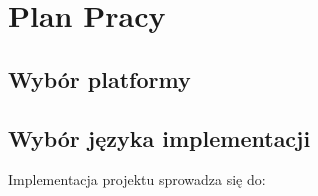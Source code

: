 \section{Plan Pracy}
\subsection{Wybór platformy}
\subsection{Wybór języka implementacji}
Implementacja projektu sprowadza się do:
